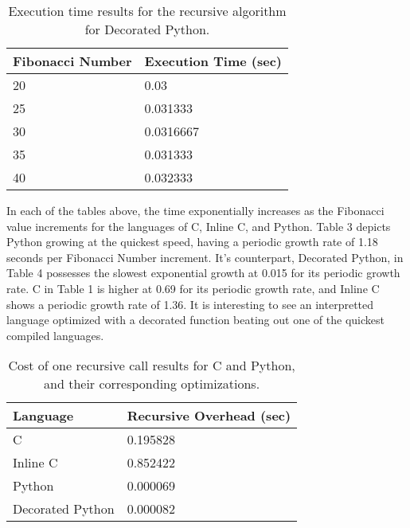 \documentclass{sig-alternate}
\begin{document}
\begin{scriptsize}
\begin{table}[ht!]
  \centering
  \begin{tabular}{|l|l|}
    \hline
    \textbf{Fibonacci Number} & \textbf{Execution Time (sec)}\\
    \hline
    20 & 0.03\\
    \hline
    25 & 0.031333\\
	\hline
	30 & 0.0316667\\
	\hline
	35 & 0.031333\\
	\hline
	40 & 0.032333\\
	\hline
\end{tabular}
\caption{Execution time results for the recursive algorithm for Decorated Python.}
\label{table:formatting}
\end{table}
\end{scriptsize}

In each of the tables above, the time exponentially increases as the Fibonacci value increments for the languages of C, Inline C, and Python. Table 3 depicts Python growing at the quickest speed, having a periodic growth rate of 1.18 seconds per Fibonacci Number increment. It's counterpart, Decorated Python, in Table 4 possesses the slowest exponential growth at 0.015 for its periodic growth rate. C in Table 1 is higher at 0.69 for its periodic growth rate, and Inline C shows a periodic growth rate of 1.36. It is interesting to see an interpretted language optimized with a decorated function beating out one of the quickest compiled languages.

\begin{scriptsize}
\begin{table}[ht!]
  \centering
  \begin{tabular}{|l|l|}
    \hline
    \textbf{Language} & \textbf{Recursive Overhead (sec)}\\
    \hline
    C & 0.195828\\
    \hline
    Inline C & 0.852422\\
	\hline
	Python & 0.000069 \\
	\hline
	Decorated Python & 0.000082 \\
	\hline
\end{tabular}
\caption{Cost of one recursive call results for C and Python, and their corresponding optimizations.}
\label{table:formatting}
\end{table}
\end{scriptsize}
\end{document}
